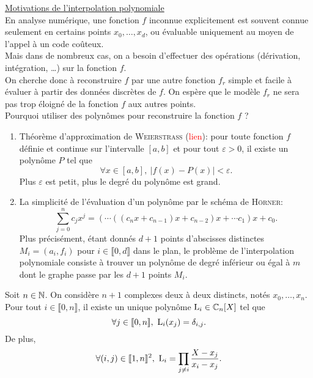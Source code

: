 \underline{Motivations de l'interpolation polynomiale} \\
En analyse numérique, une fonction $f$ inconnue explicitement est souvent connue seulement en certains points $x_0, \dots, x_d$, ou évaluable uniquement au moyen de l'appel à un code coûteux. \\
Mais dans de nombreux cas, on a besoin d'effectuer des opérations (dérivation, intégration, \dots) sur la fonction $f$. \\
On cherche donc à reconstruire $f$ par une autre fonction $f_r$ simple et facile à évaluer à partir des données discrètes de $f$. On espère que le modèle $f_r$ ne sera pas trop éloigné de la fonction $f$ aux autres points. \\
Pourquoi utiliser des polynômes pour reconstruire la fonction $f$ ?
\begin{marginfigure}[0cm]
    \centering
    
\end{marginfigure}
\begin{enumerate}
    \item Théorème d'approximation de \textsc{Weierstrass} (\textcolor{red}{lien}): pour toute fonction $f$ définie et continue sur l'intervalle $[a, b]$ et pour tout $\varepsilon > 0$, il existe un polynôme $P$ tel que 
    $$\forall x \in [a, b],\ |f(x) - P(x)| < \varepsilon.$$
    Plus $\varepsilon$ est petit, plus le degré du polynôme est grand.
    \item La simplicité de l'évaluation d'un polynôme par le schéma de \textsc{Hörner}:
    $$\sum_{j=0}^n c_j x^j = \left( \cdots \left( (c_n x + c_{n-1})x + c_{n-2} \right)x + \cdots c_1 \right)x + c_0.$$
    Plus précisément, étant donnés $d+1$ points d'abscisses distinctes $M_i = (a_i, f_i)$ pour $i \in \llbracket 0, d \rrbracket$ dans le plan, le problème de l'interpolation polynomiale consiste à trouver un polynôme de degré inférieur ou égal à $m$ dont le graphe passe par les $d+1$ points $M_i$.
\end{enumerate}

\begin{theo}
    Soit $n \in \mathbb{N}$. On considère $n + 1$ complexes deux à deux distincts, notés $x_0, \dots, x_n$. \\
    Pour tout $i \in \llbracket 0, n \rrbracket$, il existe un unique polynôme $\mathrm{L}_i \in \mathbb{C}_n[X]$ tel que 
    $$\forall j \in \llbracket 0, n \rrbracket,\ \mathrm{L}_i(x_j) = \delta_{i,j}.$$
    De plus,
        $$\forall (i, j) \in \llbracket 1, n \rrbracket^2,\ \mathrm{L}_i = \prod_{j \neq i} \frac{X-x_j}{x_i - x_j}.$$
\end{theo}

